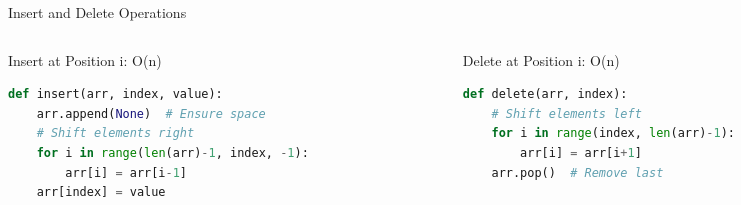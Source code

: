\documentclass[aspectratio=169,xcolor=dvipsnames]{beamer}
\begin{document}
\begin{frame}[fragile]{Insert and Delete Operations}
  \begin{columns}
    \begin{column}{0.48\textwidth}
      \begin{block}{Insert at Position i: O(n)}
        \begin{lstlisting}[language=Python,basicstyle=\tiny\ttfamily]
def insert(arr, index, value):
    arr.append(None)  # Ensure space
    # Shift elements right
    for i in range(len(arr)-1, index, -1):
        arr[i] = arr[i-1]
    arr[index] = value
        \end{lstlisting}
      \end{block}

    \end{column}
    \begin{column}{0.48\textwidth}
      \begin{block}{Delete at Position i: O(n)}
        \begin{lstlisting}[language=Python,basicstyle=\tiny\ttfamily]
def delete(arr, index):
    # Shift elements left
    for i in range(index, len(arr)-1):
        arr[i] = arr[i+1]
    arr.pop()  # Remove last
        \end{lstlisting}
      \end{block}

\end{column}
\end{columns}
\end{frame}
\end{document}
